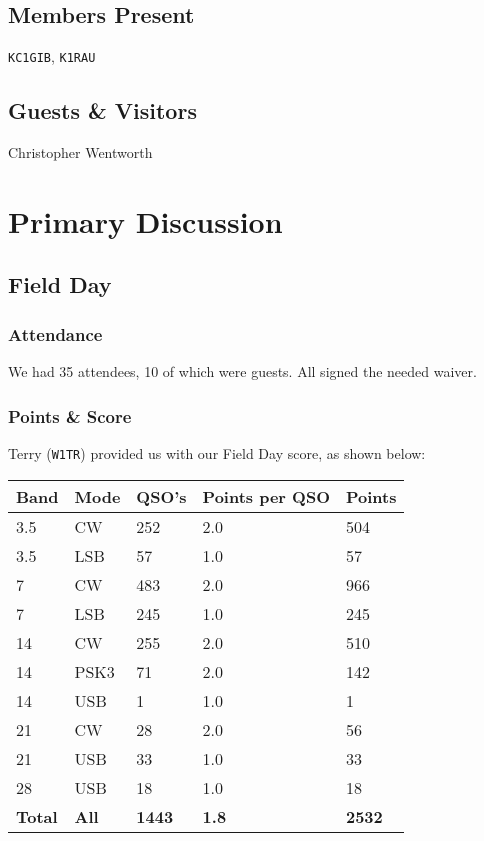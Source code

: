 \documentclass[10pt,letterpaper]{article}
\begin{document}
\subsection{Members Present}
\texttt{KC1GIB}, \texttt{K1RAU}

\subsection{Guests \& Visitors}
Christopher Wentworth

\section{Primary Discussion}

\subsection{Field Day}
\subsubsection{Attendance}
We had 35 attendees, 10 of which were guests. All signed the needed waiver.

\newpage
\subsubsection{Points \& Score}

Terry (\texttt{W1TR}) provided us with our Field Day score, as shown below:

\noindent
\begin{tabular}{|l|l|l|l|l|}
\hline
\textbf{Band} & \textbf{Mode} & \textbf{QSO's} & \textbf{Points per QSO} & \textbf{Points} \\ \hline
3.5 & CW   & 252 & 2.0 & 504 \\ \hline
3.5 & LSB  & 57  & 1.0 & 57  \\ \hline
7   & CW   & 483 & 2.0 & 966 \\ \hline
7   & LSB  & 245 & 1.0 & 245 \\ \hline
14  & CW   & 255 & 2.0 & 510 \\ \hline
14  & PSK3 & 71  & 2.0 & 142 \\ \hline
14  & USB  & 1   & 1.0 & 1   \\ \hline
21  & CW   & 28  & 2.0 & 56  \\ \hline
21  & USB  & 33  & 1.0 & 33  \\ \hline
28  & USB  & 18  & 1.0 & 18  \\ \hline
\textbf{Total} & \textbf{All} & \textbf{1443} & \textbf{1.8} & \textbf{2532} \\ \hline
\end{tabular}\\
\end{document}
